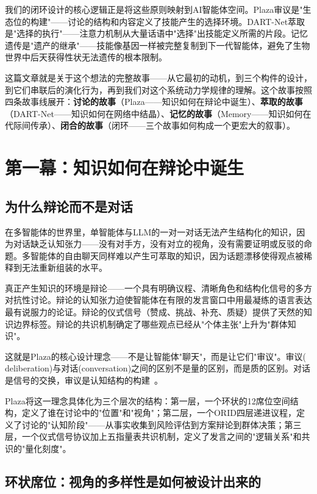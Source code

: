 \documentclass[twocolumn,10.5pt]{ctexart}
\begin{document}
我们的闭环设计的核心逻辑正是将这些原则映射到AI智能体空间。Plaza审议是"生态位的构建"——讨论的结构和内容定义了技能产生的选择环境。DART-Net萃取是"选择的执行"——注意力机制从大量话语中"选择"出技能定义所需的片段。记忆遗传是"遗产的继承"——技能像基因一样被完整复制到下一代智能体，避免了生物世界中后天获得性状无法遗传的根本限制。

这篇文章就是关于这个想法的完整故事——从它最初的动机，到三个构件的设计，到它们串联后的演化行为，再到我们对这个系统动力学规律的理解。这个故事按照四条故事线展开：\textbf{讨论的故事}（Plaza——知识如何在辩论中诞生）、\textbf{萃取的故事}（DART-Net——知识如何在网络中结晶）、\textbf{记忆的故事}（Memory——知识如何在代际间传承）、\textbf{闭合的故事}（闭环——三个故事如何构成一个更宏大的叙事）。

\section{第一幕：知识如何在辩论中诞生}

\subsection{为什么辩论而不是对话}

在多智能体的世界里，单智能体与LLM的一对一对话无法产生结构化的知识，因为对话缺乏认知张力——没有对手方，没有对立的视角，没有需要证明或反驳的命题。多智能体的自由聊天同样难以产生可萃取的知识，因为话题漂移使得观点被稀释到无法重新组装的水平。

真正产生知识的环境是辩论——一个具有明确议程、清晰角色和结构化信号的多方对抗性讨论。辩论的认知张力迫使智能体在有限的发言窗口中用最凝练的语言表达最有说服力的论证。辩论的仪式信号（赞成、挑战、补充、质疑）提供了天然的知识边界标签。辩论的共识机制确定了哪些观点已经从"个体主张"上升为"群体知识"。

这就是Plaza的核心设计理念——不是让智能体"聊天"，而是让它们"审议"。审议( deliberation)与对话(conversation)之间的区别不是量的区别，而是质的区别。对话是信号的交换，审议是认知结构的构建~\cite{kaner2014facilitator}。

Plaza将这一理念具体化为三个层次的结构：第一层，一个环状的12席位空间结构，定义了谁在讨论中的"位置"和"视角"；第二层，一个ORID四层递进议程，定义了讨论的"认知阶段"——从事实收集到风险评估到方案辩论到群体决策；第三层，一个仪式信号协议加上五指量表共识机制，定义了发言之间的"逻辑关系"和共识的"量化刻度"。

\subsection{环状席位：视角的多样性是如何被设计出来的}
\end{document}
